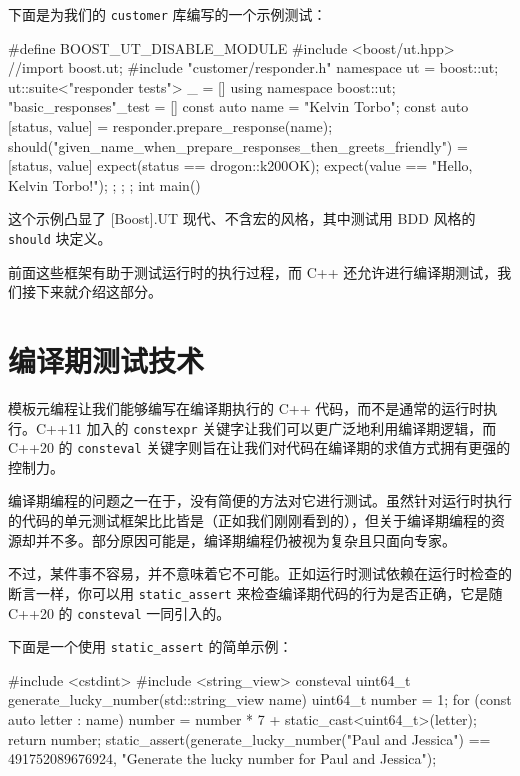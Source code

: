 下面是为我们的 \texttt{customer} 库编写的一个示例测试：

\begin{codebox}[cpp]
#define BOOST_UT_DISABLE_MODULE
#include <boost/ut.hpp>
//import boost.ut;
#include "customer/responder.h"
namespace ut = boost::ut;
ut::suite<"responder tests"> _ = [] {
  using namespace boost::ut;
  "basic_responses"_test = [] {
    const auto name = "Kelvin Torbo";
    const auto [status, value] = responder{}.prepare_response(name);
    should("given_name_when_prepare_responses_then_greets_friendly") =   
    [status, value] {
      expect(status == drogon::k200OK);
      expect(value == "Hello, Kelvin Torbo!");
    };
  };
};
int main() {}
\end{codebox}

\label{idx:838}
这个示例凸显了 [Boost].UT 现代、不含宏的风格，其中测试用 BDD 风格的 \texttt{should} 块定义。

\label{idx:839}
前面这些框架有助于测试运行时的执行过程，而 C++ 还允许进行编译期测试，我们接下来就介绍这部分。

\section{编译期测试技术}

\label{idx:840}
模板元编程让我们能够编写在编译期执行的 C++ 代码，而不是通常的运行时执行。C++11 加入的 \texttt{constexpr} 关键字让我们可以更广泛地利用编译期逻辑，而 C++20 的 \texttt{consteval} 关键字则旨在让我们对代码在编译期的求值方式拥有更强的控制力。

编译期编程的问题之一在于，没有简便的方法对它进行测试。虽然针对运行时执行的代码的单元测试框架比比皆是（正如我们刚刚看到的），但关于编译期编程的资源却并不多。部分原因可能是，编译期编程仍被视为复杂且只面向专家。

不过，某件事不容易，并不意味着它不可能。正如运行时测试依赖在运行时检查的断言一样，你可以用 \texttt{static\_\allowbreak{}assert} 来检查编译期代码的行为是否正确，它是随 C++20 的 \texttt{consteval} 一同引入的。

下面是一个使用 \texttt{static\_\allowbreak{}assert} 的简单示例：

\begin{codebox}[cpp]
#include <cstdint>
#include <string_view>
consteval uint64_t  generate_lucky_number(std::string_view name) {
  uint64_t number = 1;
  for (const auto letter : name) {
    number = number * 7 + static_cast<uint64_t>(letter);
  }
  return number;
}
static_assert(generate_lucky_number("Paul and Jessica") == 491752089676924,
              "Generate the lucky number for Paul and Jessica");
\end{codebox}

